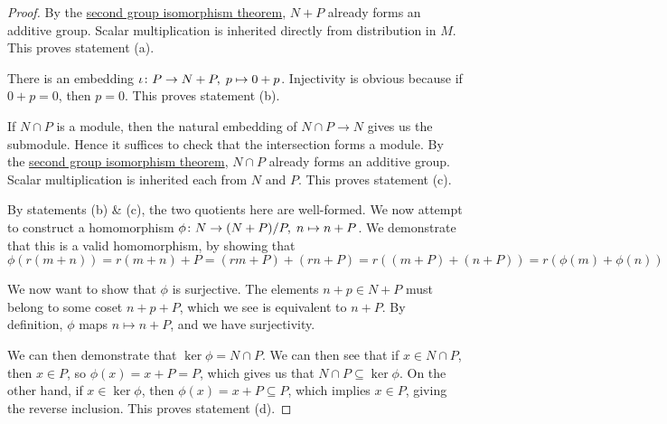 \begin{proof}
    By the \hyperref[thm:iso-2-group]{second group isomorphism theorem},
    \(N+P\) already forms an additive group.
    Scalar multiplication is inherited directly from distribution in \(M\).
    This proves statement (a).

    \medskip

    There is an embedding \(\iota\colon P\to N+P,\;p\mapsto0+p\).
    Injectivity is obvious because if \(0+p = 0\), then \(p=0\).
    This proves statement (b).

    \medskip

    If \(N \cap P\) is a module,
    then the natural embedding of \(N \cap P \to N\) gives us the submodule.
    Hence it suffices to check that the intersection forms a module.
    By the \hyperref[thm:iso-2-group]{second group isomorphism theorem},
    \(N \cap P\) already forms an additive group.
    Scalar multiplication is inherited each from \(N\) and \(P\).
    This proves statement (c).

    \medskip

    By statements (b) \& (c), the two quotients here are well-formed.
    We now attempt to construct a homomorphism \(\phi\colon N\to(N+P)/P,\;n\mapsto n+P\).
    We demonstrate that this is a valid homomorphism, by showing that
    \begin{equation*}
        \phi(r(m+n)) = r(m+n) + P = (rm+P) + (rn+P)
        = r((m+P) + (n+P)) = r(\phi(m)+\phi(n))
    \end{equation*}

    We now want to show that \(\phi\) is surjective.
    The elements \(n+p \in N+P\) must belong to some coset \(n+p+P\),
    which we see is equivalent to \(n+P\).
    By definition, \(\phi\) maps \(n \mapsto n+P\),
    and we have surjectivity.

    We can then demonstrate that \(\ker\phi = N \cap P\).
    We can then see that if \(x \in N \cap P\),
    then \(x \in P\), so \(\phi(x) = x+P = P\),
    which gives us that \(N \cap P \subseteq \ker\phi\).
    On the other hand, if \(x \in \ker\phi\),
    then \(\phi(x) = x+P \subseteq P\),
    which implies \(x \in P\),
    giving the reverse inclusion.
    This proves statement (d).
\end{proof}

